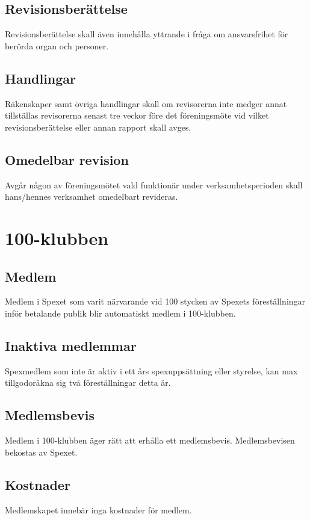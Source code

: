 \documentclass[a4paper]{article}
\begin{document}
\subsection{Revisionsberättelse}
Revisionsberättelse skall även innehålla yttrande i fråga om ansvarsfrihet för berörda organ och personer.

\subsection{Handlingar}
Räkenskaper samt övriga handlingar skall om revisorerna inte medger annat tillställas revisorerna senast tre veckor före det föreningsmöte vid vilket revisionsberättelse eller annan rapport skall avges.

\subsection{Omedelbar revision}
Avgår någon av föreningsmötet vald funktionär under verksamhetsperioden skall hans/hennes verksamhet omedelbart revideras.

\section{100-klubben}
\label{section:100-klubben}

\subsection{Medlem}
Medlem i Spexet som varit närvarande vid 100 stycken av Spexets föreställningar inför betalande publik blir automatiskt medlem i 100-klubben.

\subsection{Inaktiva medlemmar}
Spexmedlem som inte är aktiv i ett års spexuppsättning eller styrelse, kan max tillgodoräkna sig två föreställningar detta år.

\subsection{Medlemsbevis}
Medlem i 100-klubben äger rätt att erhålla ett medlemsbevis. Medlemsbevisen bekostas av Spexet.

\subsection{Kostnader}
Medlemskapet innebär inga kostnader för medlem.
\end{document}
